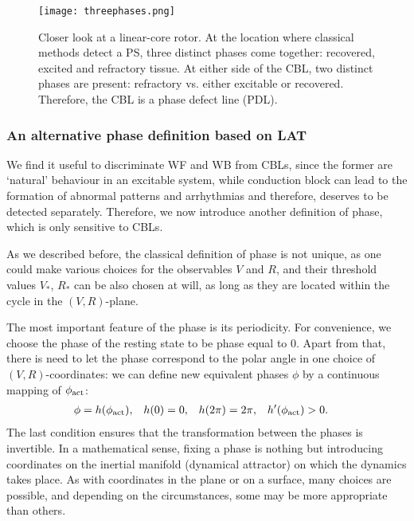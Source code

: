 \documentclass[aps,pre,amsfonts,amssymb,amsmath,twocolumn, superscriptaddress]{revtex4-1}
\newcommand{\phiact}{\ensuremath{\phi_{\rm act}}}
\newcommand{\VS}{V_*}
\newcommand{\RS}{R_*}
\begin{document}
 \begin{figure*}
     \centering
     \texttt{[image: threephases.png]}
     \caption{Closer look at a linear-core rotor. At the location where classical methods detect a PS, three distinct phases come together: recovered, excited and refractory tissue. At either side of the CBL, two distinct phases are present: refractory vs. either excitable or recovered. Therefore, the CBL is a phase defect line (PDL).}
     \label{fig:phasediagram}
 \end{figure*}


\subsubsection{An alternative phase definition based on LAT}


We find it useful to discriminate WF and WB from CBLs, since the former are `natural' behaviour in an excitable system, while conduction block can lead to the formation of abnormal patterns and arrhythmias and therefore, deserves to be detected separately. Therefore, we now introduce another definition of phase, which is only sensitive to CBLs.

As we described before, the classical definition of phase is not unique, as one could make various choices for the observables $V$ and $R$, and their threshold values $\VS$, $\RS$ can be also chosen at will, as long as they are located within the cycle in the $(V,R)$-plane. 

The most important feature of the phase is its periodicity. For convenience, we choose the phase of the resting state to be phase equal to $0$. Apart from that, there is need to let the phase correspond to the polar angle in one choice of $(V,R)$-coordinates: we can define new equivalent phases $\phi$ by a continuous mapping of $\phiact$: 
\begin{align}
    \phi &= h(\phiact), & h(0) &= 0, & h(2\pi) &=2\pi, & h'(\phiact) &>0.
\end{align}
The last condition ensures that the transformation between the phases is invertible. In a mathematical sense, fixing a phase is nothing but introducing coordinates on the inertial manifold (dynamical attractor) on which the dynamics takes place. As with coordinates in the plane or on a surface, many choices are possible, and depending on the circumstances, some may be more appropriate than others. 
\end{document}
